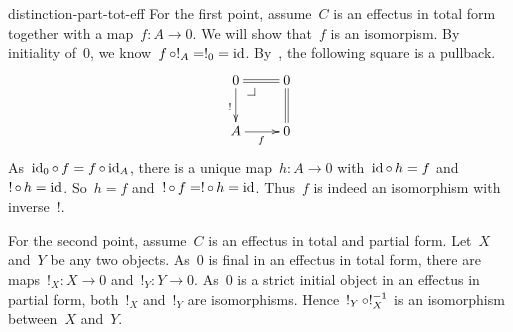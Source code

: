 \begin{solution}{distinction-part-tot-eff}%
For the first point, assume~$C$ is an effectus in total form
    together with a map~$f\colon A \to 0$.
    We will show that~$f$ is an isomorpism.
    By initiality of~$0$, we know~$f \mathop{\circ} !_A = !_0 = \mathrm{id}$.
By~, the following square is a pullback.
\begin{equation*}
    \xymatrix{
        0 \pullback \ar[d]_{!} \ar@{=}[r]
        & 0 \ar@{=}[d]
        \\
        A \ar[r]_{f}
        & 0
    }
\end{equation*}
As~$\mathrm{id}_0 \mathop{\circ} f = f \mathop{\circ} \mathrm{id}_A$,
    there is a unique map~$h\colon A \to 0$
        with~$\mathrm{id} \mathop{\circ} h = f$ and~$! \mathop{\circ} h = \mathrm{id}$.
So~$h = f$ and~$! \mathop{\circ} f = ! \mathop{\circ} h = \mathrm{id}$.
Thus~$f$ is indeed an isomorphism with inverse~$!$.

For the second point, assume~$C$ is an effectus in total and partial form.
Let~$X$ and~$Y$ be any two objects.
As~$0$ is final in an effectus in total form,
    there are maps~$!_X \colon X \to 0$ and~$!_Y \colon Y \to 0$.
As~$0$ is a strict initial object in an effectus in partial form,
    both~$!_X$ and~$!_Y$ are isomorphisms.
Hence~$!_Y \mathop{\circ} !_X^{-1}$ is an isomorphism between~$X$ and~$Y$.
\end{solution}
